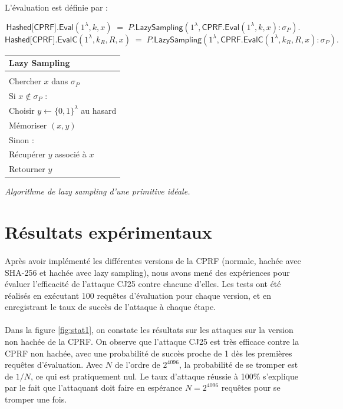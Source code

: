 \documentclass[9pt]{extarticle}
\begin{document}
L'évaluation est définie par :

\[
\textsf{Hashed[CPRF].Eval}(1^\lambda, k, x)
\;=\;
\textsf{$P$.LazySampling}(1^\lambda, \textsf{CPRF.Eval}(1^\lambda, k, x) : \sigma_P).
\]
\[
\textsf{Hashed[CPRF].EvalC}(1^\lambda, k_R, R, x)
\;=\;
\textsf{$P$.LazySampling}(1^\lambda, \textsf{CPRF.EvalC}(1^\lambda, k_R, R, x) : \sigma_P).
\]


\begin{center}
  \begin{tabular}{l}
    \textbf{Lazy Sampling} \\
    \hline \\
    Chercher $x$ dans $\sigma_P$ \\
    Si $x \notin \sigma_P$ : \\
    \quad Choisir $y \leftarrow \{0,1\}^\lambda$ au hasard \\
    \quad Mémoriser $(x,y)$ \\
    Sinon : \\
    \quad Récupérer $y$ associé à $x$ \\
    Retourner $y$
  \end{tabular}
  
  \vspace{1ex}
  \textit{Algorithme de lazy sampling d'une primitive idéale.}
\end{center}





\section{Résultats expérimentaux}

\paragraph{}Après avoir implémenté les différentes versions de la CPRF (normale, hachée avec SHA-256 et hachée avec lazy sampling), nous avons mené des expériences pour évaluer l’efficacité de l’attaque CJ25 contre chacune d’elles.
Les tests ont été réalisés en exécutant 100 requêtes d’évaluation pour chaque version, et en enregistrant le taux de succès de l’attaque à chaque étape.

\paragraph{}Dans la figure \ref{fig:stat1}, on constate les résultats sur les attaques sur la version non hachée de la CPRF. On observe que l'attaque CJ25 est très efficace contre la CPRF non hachée, avec une probabilité de succès proche de 1 dès les premières requêtes d'évaluation. Avec $N$ de l'ordre de $2^{4096}$, la probabilité de se tromper est de $1/N$, ce qui est pratiquement nul.
Le taux d'attaque réussie à 100\% s'explique par le fait que l'attaquant doit faire en espérance $N = 2^{4096}$ requêtes pour se tromper une fois.
\end{document}
